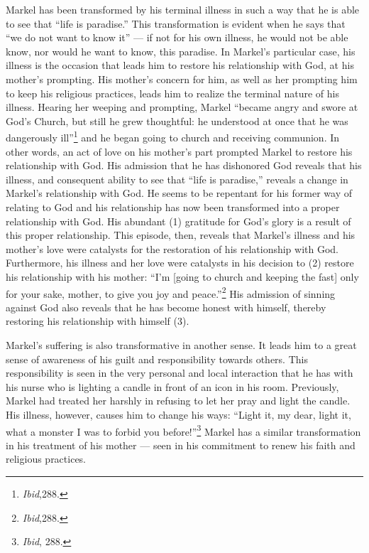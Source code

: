 Markel has been transformed by his terminal illness in such a way that he is able to see that ``life is paradise.'' This transformation is evident when he says that ``we do not want to know it'' --- if not for his own illness, he would not be able know, nor would he want to know, this paradise. In Markel's particular case, his illness is the occasion that leads him to restore his relationship with God, at his mother's prompting. His mother's concern for him, as well as her prompting him to keep his religious practices, leads him to realize the terminal nature of his illness. Hearing her weeping and prompting, Markel ``became angry and swore at God's Church, but still he grew thoughtful: he understood at once that he was dangerously ill''\footnote{\emph{Ibid},288.} and he began going to church and receiving communion. In other words, an act of love on his mother's part prompted Markel to restore his relationship with God. His admission that he has dishonored God reveals that his illness, and consequent ability to see that ``life is paradise,'' reveals a change in Markel's relationship with God. He seems to be repentant for his former way of relating to God and his relationship has now been transformed into a proper relationship with God. His abundant (1) gratitude for God's glory is a result of this proper relationship. This episode, then, reveals that Markel's illness and his mother's love were catalysts for the restoration of his relationship with God. Furthermore, his illness and her love were catalysts in his decision to (2) restore his relationship with his mother: ``I'm [going to church and keeping the fast] only for your sake, mother, to give you joy and peace.''\footnote{\emph{Ibid},288.} His admission of sinning against God also reveals that he has become honest with himself, thereby restoring his relationship with himself (3).

Markel's suffering is also transformative in another sense. It leads him to a great sense of awareness of his guilt and responsibility towards others. This responsibility is seen in the very personal and local interaction that he has with his nurse who is lighting a candle in front of an icon in his room. Previously, Markel had treated her harshly in refusing to let her pray and light the candle. His illness, however, causes him to change his ways: ``Light it, my dear, light it, what a monster I was to forbid you before!''\footnote{\emph{Ibid}, 288.} Markel has a similar transformation in his treatment of his mother --- seen in his commitment to renew his faith and religious practices.

